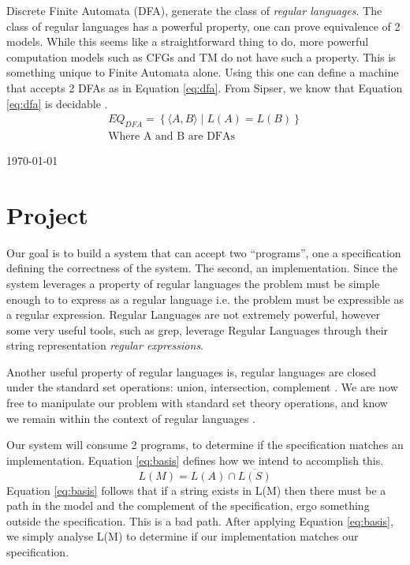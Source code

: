 \documentclass[12pt,journal,compsoc]{IEEEtran}
\theoremstyle{plain}%
\theoremstyle{definition}
\theoremstyle{remark}
\begin{document}
Discrete Finite Automata (DFA), generate the class of \emph{regular languages}.  
The class of regular languages has a powerful property, one can prove equivalence
of 2 models. While this seems like a straightforward thing to do, more powerful
computation models such as CFGs \cite[p.~172]{Sipser} and TM
\cite[p.192]{Sipser} do not have such a property. This is
something unique to Finite Automata alone. Using this one can define a machine
that accepts 2 DFAs as in Equation \ref{eq:dfa}. From Sipser, we know that
Equation \ref{eq:dfa} is decidable \cite[p.~169]{Sipser}.
\begin{multline}
    EQ_{DFA} = \left\{ \langle A, B \rangle  \mid  L( A ) = L( B ) \right\} \\
    \text{Where A and B are DFAs}
    \label{eq:dfa}
\end{multline}

\hfill \today


\section{Project}
Our goal is to build a system that can accept two ``programs'', one
a specification defining the correctness of the system. The second, an
implementation. Since the system leverages a property of regular languages the
problem must be simple enough to to express as a regular language i.e. the
problem must be expressible as a regular expression. Regular Languages are not extremely powerful, however  some very useful tools,
such as grep, leverage Regular Languages through their string representation
\emph{regular expressions}. 

Another useful property of regular
languages is, regular languages are closed under the standard set operations: union,
intersection, complement \cite[p.~45]{Sipser}.  We are now free to manipulate
our problem with standard set theory operations, and know we remain within the
context of regular languages \cite[p.~60]{Sipser}.

Our system will consume 2 programs, to determine if the
specification matches an implementation.
Equation \ref{eq:basis} defines how we intend to accomplish this. 
\begin{equation}
L( M ) = L( A ) \cap \overline{L ( S ) } 
\label{eq:basis}
\end{equation}
Equation \ref{eq:basis} follows that if a string exists in L(M) then there must
be a path in the model and the complement of the specification, ergo something
outside the specification. This is a bad path. After applying Equation
\ref{eq:basis}, we simply analyse L(M) to determine if our implementation matches
our specification.
\end{document}
